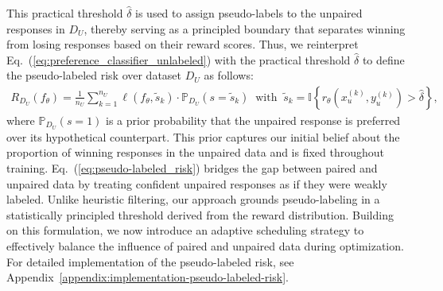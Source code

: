 \documentclass{article} %
\newcommand\rebuttal[1]{\textcolor{black}{#1}}
\begin{document}
This practical threshold $\hat{\delta}$ is used to assign pseudo-labels to the unpaired responses in $D_U$, thereby serving as a principled boundary that separates winning from losing responses based on their reward scores. 
Thus, we reinterpret Eq.~(\ref{eq:preference_classifier_unlabeled}) with the practical threshold $\hat{\delta}$ to define the pseudo-labeled risk over dataset $D_U$ as follows:
\begin{align}
\label{eq:pseudo-labeled_risk}
    R_{D_U}(f_\theta) = \frac{1}{n_U} \sum_{k=1}^{n_U} \ell(f_\theta, \tilde{s}_k) \cdot \mathbb{P}_{D_U}(s = \tilde{s}_k) \;\; \text{with}\;\; \tilde{s}_k = \mathbb{I}\left\{ r_\theta(x_u^{(k)}, y_u^{(k)}) > \hat{\delta} \right\},
\end{align}
where $\mathbb{P}_{D_U}(s = 1)$ is a prior probability that the unpaired response is preferred over its hypothetical counterpart. This prior captures our initial belief about the proportion of winning responses in the unpaired data and is fixed throughout training.
Eq.~(\ref{eq:pseudo-labeled_risk}) bridges the gap between paired and unpaired data by treating confident unpaired responses as if they were weakly labeled. Unlike heuristic filtering, our approach grounds pseudo-labeling in a statistically principled threshold derived from the reward distribution. Building on this formulation, we now introduce an adaptive scheduling strategy to effectively balance the influence of paired and unpaired data during optimization. For detailed implementation of the pseudo-labeled risk, see Appendix~\ref{appendix:implementation-pseudo-labeled-risk}.
\vspace{-1mm}
\end{document}
